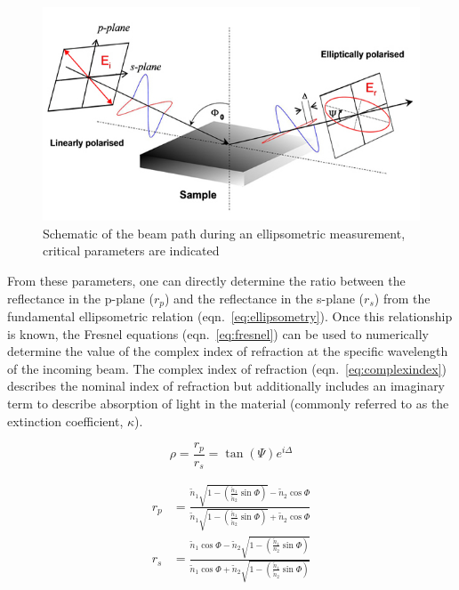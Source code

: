 \begin{figure}[htbp]
   \centering
   \includegraphics[width=\linewidth]{./figures/characterization/ellipsometryDiagram_simple} 
   \caption[Ellipsometric Beam Path and Modeling Parameters]{Schematic of the beam path during an %
   					ellipsometric measurement, \\ critical parameters are indicated}
   \label{fig:ellipsometry}
\end{figure}

From these parameters, one can directly determine the ratio between the reflectance in the p-plane ($r_{p}$) and the reflectance in the s-plane ($r_{s}$) from the fundamental ellipsometric relation (eqn.~\ref{eq:ellipsometry}).  Once this relationship is known, the Fresnel equations (eqn.~\ref{eq:fresnel}) can be used to numerically determine the value of the complex index of refraction at the specific wavelength of the incoming beam. The complex index of refraction (eqn.~\ref{eq:complexindex}) describes the nominal index of refraction but additionally includes an imaginary term to describe absorption of light in the material (commonly referred to as the extinction coefficient, $\kappa$).  

\begin{equation}
 \label{eq:ellipsometry}
 \displaystyle
	\rho = \frac{r_{p}}{r_{s}} = \tan(\Psi)e^{i\Delta}
\end{equation}

\begin{subequations}
\label{eq:fresnel}
\begin{align}
	r_{p} &= \frac{\tilde{n}_{1}\sqrt{1- \left(\frac{\tilde{n}_{1}}{\tilde{n}_{2}}\sin\Phi\right)} - \tilde{n}_{2}\cos\Phi}{\tilde{n}_{1}\sqrt{1- \left(\frac{\tilde{n}_{1}}{\tilde{n}_{2}}\sin\Phi\right)} + \tilde{n}_{2}\cos\Phi} \\
        	r_{s} &= \frac{\tilde{n}_{1}\cos\Phi - \tilde{n}_{2}\sqrt{1- \left(\frac{\tilde{n}_{1}}{n_{2}}\sin\Phi\right)}}{\tilde{n}_{1}\cos\Phi + \tilde{n}_{2}\sqrt{1- \left(\frac{\tilde{n}_{1}}{\tilde{n}_{2}}\sin\Phi\right)}}
\end{align}
\end{subequations}

